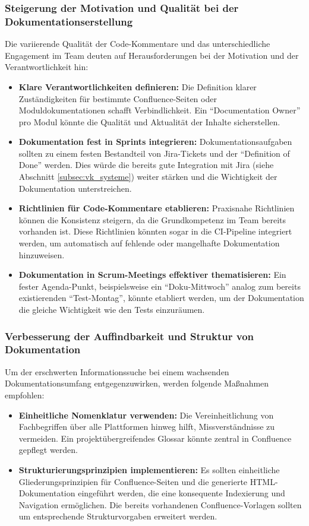 \documentclass[12pt,oneside]{article}
\begin{document}
    \subsubsection{Steigerung der Motivation und Qualität bei der Dokumentationserstellung}
    \label{subsubsec:doku_motivation_qualitaet}
    Die variierende Qualität der Code-Kommentare und das unterschiedliche Engagement im Team deuten auf Herausforderungen bei der Motivation und der Verantwortlichkeit hin:
    \begin{itemize}
        \item \textbf{Klare Verantwortlichkeiten definieren:} Die Definition klarer Zuständigkeiten für bestimmte Confluence-Seiten oder Moduldokumentationen schafft Verbindlichkeit. Ein ``Documentation Owner'' pro Modul könnte die Qualität und Aktualität der Inhalte sicherstellen.
        \item \textbf{Dokumentation fest in Sprints integrieren:} Dokumentationsaufgaben sollten zu einem festen Bestandteil von Jira-Tickets und der ``Definition of Done'' werden. Dies würde die bereits gute Integration mit Jira (siehe Abschnitt \ref{subsec:vk_systeme}) weiter stärken und die Wichtigkeit der Dokumentation unterstreichen.
        \item \textbf{Richtlinien für Code-Kommentare etablieren:} Praxisnahe Richtlinien können die Konsistenz steigern, da die Grundkompetenz im Team bereits vorhanden ist. Diese Richtlinien könnten sogar in die CI-Pipeline integriert werden, um automatisch auf fehlende oder mangelhafte Dokumentation hinzuweisen.
        \item \textbf{Dokumentation in Scrum-Meetings effektiver thematisieren:} Ein fester Agenda-Punkt, beispielsweise ein ``Doku-Mittwoch'' analog zum bereits existierenden ``Test-Montag'', könnte etabliert werden, um der Dokumentation die gleiche Wichtigkeit wie den Tests einzuräumen.
    \end{itemize}

    \subsubsection{Verbesserung der Auffindbarkeit und Struktur von Dokumentation}
    \label{subsubsec:doku_auffindbarkeit}
    Um der erschwerten Informationssuche bei einem wachsenden Dokumentationsumfang entgegenzuwirken, werden folgende Maßnahmen empfohlen:
    \begin{itemize}
        \item \textbf{Einheitliche Nomenklatur verwenden:} Die Vereinheitlichung von Fachbegriffen über alle Plattformen hinweg hilft, Missverständnisse zu vermeiden. Ein projektübergreifendes Glossar könnte zentral in Confluence gepflegt werden.
        \item \textbf{Strukturierungsprinzipien implementieren:} Es sollten einheitliche Gliederungsprinzipien für Confluence-Seiten und die generierte HTML-Dokumentation eingeführt werden, die eine konsequente Indexierung und Navigation ermöglichen. Die bereits vorhandenen Confluence-Vorlagen sollten um entsprechende Strukturvorgaben erweitert werden.
    \end{itemize}
\end{document}
